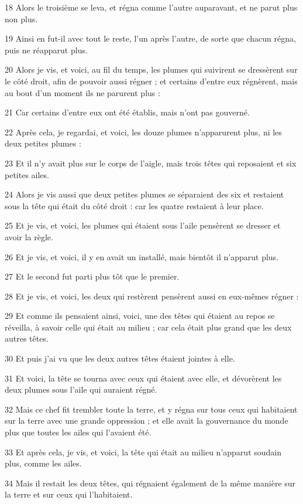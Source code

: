 \par 18 Alors le troisième se leva, et régna comme l'autre auparavant, et ne parut plus non plus.
\par 19 Ainsi en fut-il avec tout le reste, l'un après l'autre, de sorte que chacun régna, puis ne réapparut plus.
\par 20 Alors je vis, et voici, au fil du temps, les plumes qui suivirent se dressèrent sur le côté droit, afin de pouvoir aussi régner ; et certains d'entre eux régnèrent, mais au bout d'un moment ils ne parurent plus :
\par 21 Car certains d'entre eux ont été établis, mais n'ont pas gouverné.
\par 22 Après cela, je regardai, et voici, les douze plumes n'apparurent plus, ni les deux petites plumes :
\par 23 Et il n'y avait plus sur le corps de l'aigle, mais trois têtes qui reposaient et six petites ailes.
\par 24 Alors je vis aussi que deux petites plumes se séparaient des six et restaient sous la tête qui était du côté droit : car les quatre restaient à leur place.
\par 25 Et je vis, et voici, les plumes qui étaient sous l'aile pensèrent se dresser et avoir la règle.
\par 26 Et je vis, et voici, il y en avait un installé, mais bientôt il n'apparut plus.
\par 27 Et le second fut parti plus tôt que le premier.
\par 28 Et je vis, et voici, les deux qui restèrent pensèrent aussi en eux-mêmes régner :
\par 29 Et comme ils pensaient ainsi, voici, une des têtes qui étaient au repos se réveilla, à savoir celle qui était au milieu ; car cela était plus grand que les deux autres têtes.
\par 30 Et puis j'ai vu que les deux autres têtes étaient jointes à elle.
\par 31 Et voici, la tête se tourna avec ceux qui étaient avec elle, et dévorèrent les deux plumes sous l'aile qui auraient régné.
\par 32 Mais ce chef fit trembler toute la terre, et y régna sur tous ceux qui habitaient sur la terre avec une grande oppression ; et elle avait la gouvernance du monde plus que toutes les ailes qui l'avaient été.
\par 33 Et après cela, je vis, et voici, la tête qui était au milieu n'apparut soudain plus, comme les ailes.
\par 34 Mais il restait les deux têtes, qui régnaient également de la même manière sur la terre et sur ceux qui l'habitaient.
